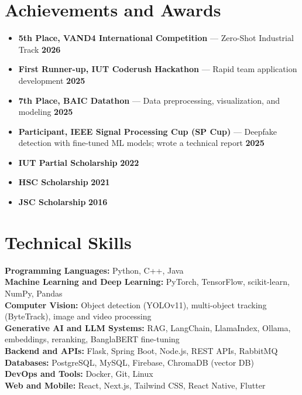 \documentclass{resume}
\renewenvironment{rSection}[1]{
  \Needspace{3\baselineskip}%
  \section{#1}
  \begin{list}{}{
      \setlength{\leftmargin}{0.2em}
  }
  \item[]
}{
  \end{list}
  \vspace{0pt}
}
\begin{document}
\begin{rSection}{Achievements and Awards}
\begin{itemize}[leftmargin=*,label=$\bullet$]
  \item \textbf{5th Place, VAND4 International Competition} --- Zero-Shot Industrial Track \hfill \textbf{2026}
  \item \textbf{First Runner-up, IUT Coderush Hackathon} --- Rapid team application development \hfill \textbf{2025}
  \item \textbf{7th Place, BAIC Datathon} --- Data preprocessing, visualization, and modeling \hfill \textbf{2025}
  \item \textbf{Participant, IEEE Signal Processing Cup (SP Cup)} --- Deepfake detection with fine-tuned ML models; wrote a technical report \hfill \textbf{2025}
  \item \textbf{IUT Partial Scholarship} \hfill \textbf{2022}
  \item \textbf{HSC Scholarship} \hfill \textbf{2021}
  \item \textbf{JSC Scholarship} \hfill \textbf{2016}
\end{itemize}
\end{rSection}

\begin{rSection}{Technical Skills}
\textbf{Programming Languages:} Python, C++, Java \\
\textbf{Machine Learning and Deep Learning:} PyTorch, TensorFlow, scikit-learn, NumPy, Pandas \\
\textbf{Computer Vision:} Object detection (YOLOv11), multi-object tracking (ByteTrack), image and video processing \\
\textbf{Generative AI and LLM Systems:} RAG, LangChain, LlamaIndex, Ollama, embeddings, reranking, BanglaBERT fine-tuning \\
\textbf{Backend and APIs:} Flask, Spring Boot, Node.js, REST APIs, RabbitMQ \\
\textbf{Databases:} PostgreSQL, MySQL, Firebase, ChromaDB (vector DB) \\
\textbf{DevOps and Tools:} Docker, Git, Linux \\
\textbf{Web and Mobile:} React, Next.js, Tailwind CSS, React Native, Flutter \\
\end{rSection}
\end{document}
